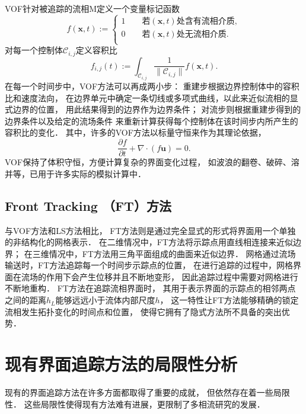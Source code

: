 VOF针对被追踪的流相M定义一个变量标记函数
\begin{equation}\label{bilevel}
f(\mathbf{x},t):=
\left\{\begin{array}{l}
1  \qquad　\text{若}(\mathbf{x},t)\text{处含有流相介质},\\[0.2cm]
0  \qquad　\text{若}(\mathbf{x},t)\text{处无流相介质}.\\[0.1cm]
	\end{array}\right.
	\end{equation}
对每一个控制体$\mathcal{C}_{i,j}$定义容积比
\begin{equation}
f_{i,j}(t) :=\int_{\mathcal{C}_{i,j}}　\frac{1}{\|\mathcal{C}_{i,j}\|}f(\mathbf{x},t).
\end{equation}
在每一个时间步中，VOF方法可以再成两小步：
重建步根据边界控制体中的容积比和速度法向，
在边界单元中确定一条切线或多项式曲线，以此来近似流相的显式边界的位置，
用此结果得到的边界作为边界条件；
对流步则根据重建步得到的边界条件以及给定的流场条件
来重新计算获得每个控制体在该时间步内所产生的容积比的变化．
其中，许多的VOF方法以标量守恒来作为其理论依据，
\begin{equation*}
\frac{\partial f}{\partial t}+\nabla \cdot (f\mathbf{u})=0.
\end{equation*}
VOF保持了体积守恒，方便计算复杂的界面变化过程，
如波浪的翻卷、破碎、溶并等，已用于许多实际的模拟计算中．

\subsection{Front Tracking （FT）方法}
与VOF方法和LS方法相比，
FT方法则是通过完全显式的形式将界面用一个单独的非结构化的网格表示．
在二维情况中，FT方法将示踪点用直线相连接来近似边界；
在三维情况中，FT方法用三角平面组成的曲面来近似边界．
网格通过流场输送时，FT方法追踪每一个时间步示踪点的位置，
在进行追踪的过程中，网格界面在流场的作用下会产生位移并且不断地变形，
因此追踪过程中需要对网格进行不断地重构．
FT方法在追踪流相界面时，
其用于表示界面的示踪点的相邻两点之间的距离$h_L$能够远远小于流体内部尺度$h$，
这一特性让FT方法能够精确的锁定流相发生拓扑变化的时间点和位置\cite{brochu09}，
使得它拥有了隐式方法所不具备的突出优势．

\section{现有界面追踪方法的局限性分析}
现有的界面追踪方法在许多方面都取得了重要的成就，
但依然存在着一些局限性．
这些局限性使得现有方法难有进展，更限制了多相流研究的发展．

